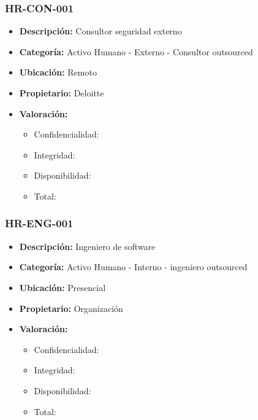 \documentclass[11pt]{utalcaDoc}
\begin{document}
\subsubsection{HR-CON-001}
\begin{itemize}
    \item {\textbf{Descripción:}   Consultor seguridad externo }
    \item {\textbf{Categoría:}     Activo Humano - Externo - Consultor outsourced}
    \item {\textbf{Ubicación:}     Remoto }
    \item {\textbf{Propietario:}   Deloitte } %
    \item {\textbf{Valoración:}
          \begin{itemize}
              \item Confidencialidad:
              \item Integridad:
              \item Disponibilidad:
              \item Total:
          \end{itemize}
          }
\end{itemize}

\subsubsection{HR-ENG-001}
\begin{itemize}
    \item {\textbf{Descripción:}   Ingeniero de software }
    \item {\textbf{Categoría:}     Activo Humano - Interno - ingeniero outsourced}
    \item {\textbf{Ubicación:}     Presencial }
    \item {\textbf{Propietario:}   Organización } %
    \item {\textbf{Valoración:}
          \begin{itemize}
              \item Confidencialidad:
              \item Integridad:
              \item Disponibilidad:
              \item Total:
          \end{itemize}
          }
\end{itemize}
\end{document}
